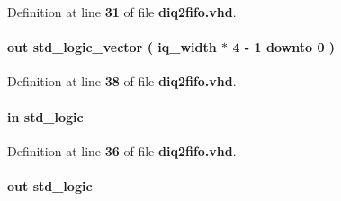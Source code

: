 Definition at line {\bf 31} of file {\bf diq2fifo.\+vhd}.

\paragraph[{fifo\+\_\+wdata}]{ {\bfseries \textcolor{keywordflow}{out}\textcolor{vhdlchar}{ }} {\bfseries \textcolor{comment}{std\+\_\+logic\+\_\+vector}\textcolor{vhdlchar}{ }\textcolor{vhdlchar}{(}\textcolor{vhdlchar}{ }\textcolor{vhdlchar}{ }\textcolor{vhdlchar}{ }\textcolor{vhdlchar}{ }{\bfseries {\bf iq\+\_\+width}} \textcolor{vhdlchar}{$\ast$}\textcolor{vhdlchar}{ } \textcolor{vhdldigit}{4} \textcolor{vhdlchar}{-\/}\textcolor{vhdlchar}{ } \textcolor{vhdldigit}{1} \textcolor{vhdlchar}{ }\textcolor{keywordflow}{downto}\textcolor{vhdlchar}{ }\textcolor{vhdlchar}{ } \textcolor{vhdldigit}{0} \textcolor{vhdlchar}{ }\textcolor{vhdlchar}{)}\textcolor{vhdlchar}{ }} \hspace{0.3cm}{\ttfamily [Port]}}\label{classdiq2fifo_a880b1371c4c1600fe490c979402d668f}


Definition at line {\bf 38} of file {\bf diq2fifo.\+vhd}.

\paragraph[{fifo\+\_\+wfull}]{ {\bfseries \textcolor{keywordflow}{in}\textcolor{vhdlchar}{ }} {\bfseries \textcolor{comment}{std\+\_\+logic}\textcolor{vhdlchar}{ }} \hspace{0.3cm}{\ttfamily [Port]}}\label{classdiq2fifo_a63de1b8160d1ffec718f19920aa9a2a1}


Definition at line {\bf 36} of file {\bf diq2fifo.\+vhd}.

\paragraph[{fifo\+\_\+wrreq}]{ {\bfseries \textcolor{keywordflow}{out}\textcolor{vhdlchar}{ }} {\bfseries \textcolor{comment}{std\+\_\+logic}\textcolor{vhdlchar}{ }} \hspace{0.3cm}{\ttfamily [Port]}}\label{classdiq2fifo_a4643410c72f0390bde3d442228a1dfd2}


